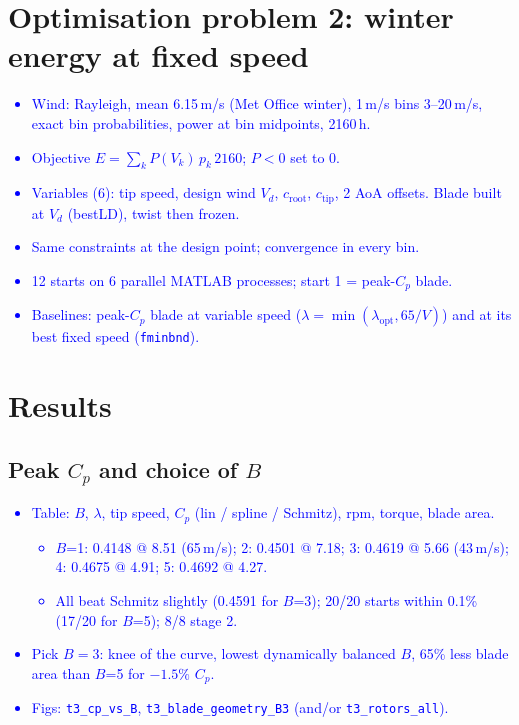 \documentclass[11pt,a4paper]{article}
\newcommand{\note}[1]{\textcolor{blue}{#1}}
\begin{document}
\section{Optimisation problem 2: winter energy at fixed speed}  %
\note{
\begin{itemize}
  \item Wind: Rayleigh, mean 6.15\,m/s (Met Office winter), 1\,m/s bins 3--20\,m/s, exact bin probabilities, power at bin midpoints, 2160\,h.
  \item Objective $E = \sum_k P(V_k)\,p_k\,2160$; $P<0$ set to 0.
  \item Variables (6): tip speed, design wind $V_d$, $c_\text{root}$, $c_\text{tip}$, 2 AoA offsets. Blade built at $V_d$ (bestLD), twist then frozen.
  \item Same constraints at the design point; convergence in every bin.
  \item 12 starts on 6 parallel MATLAB processes; start 1 = peak-$C_p$ blade.
  \item Baselines: peak-$C_p$ blade at variable speed ($\lambda = \min(\lambda_\text{opt}, 65/V)$) and at its best fixed speed (\texttt{fminbnd}).
\end{itemize}
}

\section{Results}  %
\subsection{Peak $C_p$ and choice of $B$}
\note{
\begin{itemize}
  \item Table: $B$, $\lambda$, tip speed, $C_p$ (lin / spline / Schmitz), rpm, torque, blade area.
  \begin{itemize}
    \item $B$=1: 0.4148 @ 8.51 (65\,m/s); 2: 0.4501 @ 7.18; 3: 0.4619 @ 5.66 (43\,m/s); 4: 0.4675 @ 4.91; 5: 0.4692 @ 4.27.
    \item All beat Schmitz slightly (0.4591 for $B$=3); 20/20 starts within 0.1\% (17/20 for $B$=5); 8/8 stage 2.
  \end{itemize}
  \item Pick $B = 3$: knee of the curve, lowest dynamically balanced $B$, 65\% less blade area than $B$=5 for $-1.5\%$ $C_p$.
  \item Figs: \texttt{t3\_cp\_vs\_B}, \texttt{t3\_blade\_geometry\_B3} (and/or \texttt{t3\_rotors\_all}).
\end{itemize}
}
\end{document}
